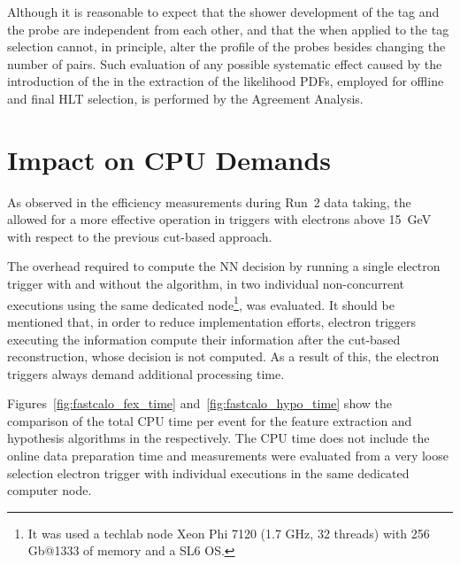 Although it is reasonable to expect that the shower development of the tag and
the probe are independent from each other, and that the \rnn{} when applied to
the tag selection cannot, in principle, alter the profile of the probes besides
changing the number of \tnp{} pairs. Such evaluation of any possible systematic effect caused by the introduction of the \rnn{} in the extraction of the likelihood PDFs, employed for offline and final HLT selection, is performed by the Agreement Analysis.

\FloatBarrier
\section{Impact on CPU Demands} \label{ssec:cpu_reduction}

As observed in the efficiency measurements during Run~2 data taking, the \rnn{} allowed for a more effective \fastcalo{} operation in triggers with electrons above \SI{15}{\GeV}  with respect to the previous cut-based approach. 






The overhead required to compute the NN decision by running a single electron trigger with and without the \rnn algorithm, in two individual non-concurrent executions using the same dedicated node\footnote{It was used a techlab node Xeon Phi 7120 (1.7 GHz, 32 threads) with 256 Gb@1333 of memory and a SL6 OS.}, was evaluated. It should be mentioned that, in order to reduce implementation efforts, electron triggers executing the \rnn{} information compute their information after the cut-based reconstruction, whose decision is not computed. As a result of this, the \rnn{} electron 
triggers always demand additional \fastcalo processing time.

Figures~\ref{fig:fastcalo_fex_time} and~\ref{fig:fastcalo_hypo_time} show the comparison of the total CPU time per event for the feature extraction and hypothesis algorithms in the \fastcalo respectively.
The CPU time does not include the online data preparation time and measurements were evaluated from a very loose selection electron trigger with individual executions in the same dedicated computer node.


